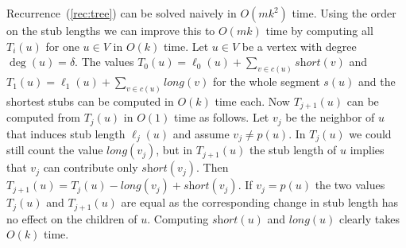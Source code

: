 \documentclass[a4paper,english,numberwithinsect]{eurocg18}
\newcommand{\sollong}{\ensuremath{\textit{long}}\xspace}
\newcommand{\solshort}{\ensuremath{\textit{short}}\xspace}
\begin{document}
Recurrence~(\ref{rec:tree}) can be solved naively in $ O(mk^2) $ time. 
Using the order on the stub lengths  we can improve this to $ O(mk) $ time by computing all $ T_i(u) $ for one $ u \in V $ in $O(k)$ time.
Let $u \in V$ be a vertex with degree $\deg(u) = \delta$. 
The values $T_0(u) = \ell_0(u) + \sum_{v\in c(u)} \solshort(v)$ and $T_1(u) = \ell_1(u) + \sum_{v\in c(u)} \sollong(v)$ for the whole segment $s(u)$ and the shortest stubs can be computed in $O(k)$ time each.
Now $T_{j+1}(u)$ can be computed from $T_j(u)$ in $O(1)$ time as follows.
Let $v_j $ be the neighbor of $u$ that induces stub length $\ell_j(u)$ and assume $v_j \ne p(u)$.
In $T_j(u)$ we could still count the value $\sollong(v_j)$, but in $T_{j+1}(u)$ the stub length of $u$ implies that $v_j$ can contribute only $\solshort(v_j)$. 
Then $T_{j+1}(u) = T_j(u) - \sollong(v_j) + \solshort(v_j)$.
If $v_j=p(u)$ the two values $T_j(u)$ and $T_{j+1}(u)$ are equal as the corresponding change in stub length has no effect on the children of $u$.
Computing $\solshort(u)$ and $\sollong(u)$ clearly takes $O(k)$ time.

%
\end{document}
